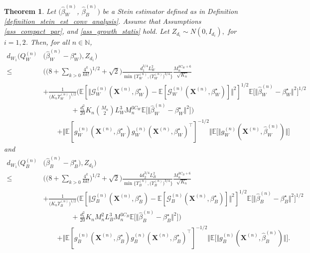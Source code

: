 \documentclass{article}
\newtheorem{Theorem}{Theorem}[section]
\begin{document}
\begin{Theorem} \label{theorem_asym_norm_bound}
    Let $(\hat{\beta}_W^{(n)}$, $\hat{\beta}_B^{(n)})$ be a Stein estimator defined as in Definition \ref{definition_stein_est_conv_analysis}. Assume that Assumptions \ref{ass_compact_par},   and \ref{ass_growth_statis}  hold. 
    Let $Z_{d_i} \sim N(0,I_{d_i}),$ for $i=1,2$. Then, for all $n \in \mathbb{N}$,
    \begin{align*}
        d_{W_1}\Big(Q_W^{(n)} &\big( \hat{\beta}_W^{(n)}-\beta_W^{\star}\big), Z_{d_1} \Big) \\
        \leq & \bigg(\bigg( 8+\sum_{k>0} \frac{4^k}{kk!} \bigg)^{1/2} + \sqrt{2}\bigg) \frac{d_1^{3/4} L_W^2}{\min\big\{\Upsilon_W^{(n)},\big(\Upsilon_W^{(n)}\big)^{3/4}\big\}} \frac{M_n^{3C_W+6} }{\sqrt{K_n}} \\
        & +\frac{1}{\big(K_n\Upsilon_W^{(n)}\big)^{1/2}} \bigg( \mathbb{E}[ \Vert \mathcal{G}_W^{(n)}(\mathbf{X}^{(n)},\beta_W^{\star}) - \mathbb{E}[\mathcal{G}_W^{(n)}(\mathbf{X}^{(n)},\beta_W^{\star})] \Vert^2 ]^{1/2} \mathbb{E}\big[ \Vert \hat{\beta}_W^{(n)} - \beta_W^{\star} \Vert^2 ]^{1/2} \\
        & \qquad \qquad+ \frac{d_1^2}{20} K_n \binom{M_n}{2}  L_W^3 M_n^{3C_W} \mathbb{E}\big[ \Vert \hat{\beta}_W^{(n)}-\beta_W^{\star}\Vert^2 \big] \bigg) \\
         & \qquad +\Vert \mathbb{E}[g_W^{(n)}(\mathbf{X}^{(n)},\beta_W^{\star})g_W^{(n)}(\mathbf{X}^{(n)},\beta_W^{\star})^{\top}]^{-1/2} \Vert \mathbb{E}\big[\Vert g_W^{(n)}(\mathbf{X}^{(n)},\hat{\beta}_W^{(n)}) \Vert \big]
    \end{align*}
  and 
    \begin{align*}
        d_{W_1}\Big(Q_B^{(n)} &\big( \hat{\beta}_B^{(n)}-\beta_B^{\star}\big), Z_{d_2}  \Big) \\
        \leq & \bigg(\bigg( 8+\sum_{k>0} \frac{4^k}{kk!} \bigg)^{1/2} + \sqrt{2}\bigg) \frac{4d_2^{3/4} L_B^2}{\min\big\{\Upsilon_B^{(n)},\big(\Upsilon_B^{(n)}\big)^{3/4}\big\}} \frac{M_n^{3C_B+6} }{\sqrt{K_n}} \\
        &  +\frac{1}{\big( K_n\Upsilon_B^{(n)}\big)^{1/2}} \bigg( \mathbb{E}[ \Vert \mathcal{G}_B^{(n)}(\mathbf{X}^{(n)},\beta_B^{\star}) -\mathbb{E}[\mathcal{G}_B^{(n)}(\mathbf{X}^{(n)},\beta_B^{\star})]  \Vert^2 ]^{1/2} \mathbb{E}\big[ \Vert \hat{\beta}_B^{(n)} - \beta_B^{\star} \Vert^2 ]^{1/2} \\
        & \qquad \qquad+ \frac{d_1^2}{20} K_n M_n^2  L_B^3 M_n^{3C_B} \mathbb{E}\big[ \Vert \hat{\beta}_B^{(n)}-\beta_B^{\star}\Vert^2 \big] \bigg) \\
        & \qquad +\Vert \mathbb{E}[g_B^{(n)}(\mathbf{X}^{(n)},\beta_B^{\star})g_B^{(n)}(\mathbf{X}^{(n)},\beta_B^{\star})^{\top}]^{-1/2} \Vert \mathbb{E}\big[\Vert g_B^{(n)}(\mathbf{X}^{(n)},\hat{\beta}_B^{(n)}) \Vert \big].
    \end{align*}
\end{Theorem}
\end{document}
